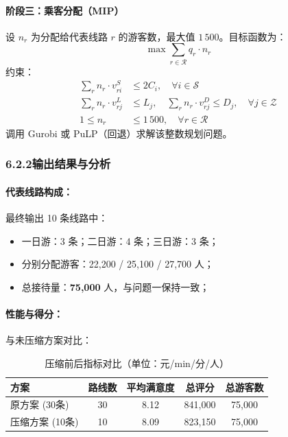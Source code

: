 \documentclass[12pt,a4paper]{article}
\begin{document}
\paragraph{阶段三：乘客分配（MIP）}
设 $n_r$ 为分配给代表线路 $r$ 的游客数，最大值 $1\,500$。目标函数为：
\[
\max \sum_{r\in\mathcal{R}} q_r \cdot n_r
\]
约束：
\begin{align*}
\sum_{r} n_r \cdot v^S_{ri} &\le 2C_i,\quad \forall i \in \mathcal{S} \\
\sum_{r} n_r \cdot v^L_{rj} &\le L_j,\quad \sum_{r} n_r \cdot v^D_{rj} \le D_j,\quad \forall j \in \mathcal{Z} \\
1 \le n_r &\le 1\,500,\quad \forall r \in \mathcal{R}
\end{align*}
调用 Gurobi 或 PuLP（回退）求解该整数规划问题。

\subsubsection*{6.2.2\quad 输出结果与分析}

\paragraph{代表线路构成：}
最终输出 10 条线路中：
\begin{itemize}
    \item 一日游：3 条；二日游：4 条；三日游：3 条；
    \item 分别分配游客：22,200 / 25,100 / 27,700 人；
    \item 总接待量：\textbf{75,000} 人，与问题一保持一致；
\end{itemize}

\paragraph{性能与得分：}
与未压缩方案对比：

\begin{table}[H]
\centering\small
\caption{压缩前后指标对比（单位：元/min/分/人）}
\begin{tabular}{lcccc}
\toprule
方案 & 路线数 & 平均满意度 & 总评分 & 总游客数 \\
\midrule
原方案 (30条) & 30 & 8.12 & 841,000 & 75,000 \\
压缩方案 (10条) & 10 & 8.09 & 823,150 & 75,000 \\
\bottomrule
\end{tabular}
\end{table}
\end{document}
